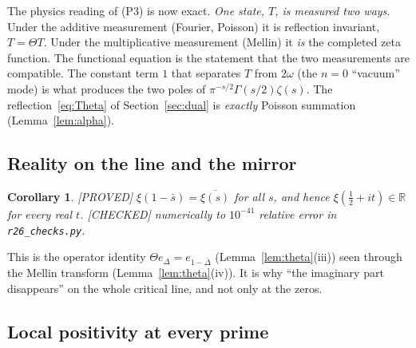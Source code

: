 \documentclass[11pt,a4paper]{article}
\theoremstyle{plain}
\newtheorem{corollary}[theorem]{Corollary}
\theoremstyle{definition}
\theoremstyle{remark}
\newcommand{\R}{\mathbb{R}}
\newcommand{\lab}[1]{\textsf{\small[#1]}}
\newcommand{\PROVED}{\lab{PROVED}}
\newcommand{\CHECKED}{\lab{CHECKED}}
\begin{document}
The physics reading of (P3) is now exact. \emph{One state, $T$, is
measured two ways.} Under the additive measurement (Fourier, Poisson) it is
reflection invariant, $T=\Theta T$. Under the multiplicative measurement
(Mellin) it \emph{is} the completed zeta function. The functional equation
is the statement that the two measurements are compatible. The constant
term $1$ that separates $T$ from $2\omega$ (the $n=0$ ``vacuum'' mode) is
what produces the two poles of $\pi^{-s/2}\Gamma(s/2)\zeta(s)$. The
reflection~\eqref{eq:Theta} of Section~\ref{sec:dual} is \emph{exactly}
Poisson summation (Lemma~\ref{lem:alpha}).

\subsection{Reality on the line and the mirror}

\begin{corollary}\label{cor:real}
\PROVED{} $\xi(1-\bar s)=\overline{\xi(s)}$ for all $s$, and hence
$\xi(\tfrac12+it)\in\R$ for every real $t$. \CHECKED{} numerically to
$10^{-41}$ relative error in \texttt{r26\_checks.py}.
\end{corollary}
\noindent
This is the operator identity $\Theta e_\Delta=e_{1-\bar\Delta}$
(Lemma~\ref{lem:theta}(iii)) seen through the Mellin transform
(Lemma~\ref{lem:theta}(iv)). It is why ``the imaginary part disappears''
on the whole critical line, and not only at the zeros.

\subsection{Local positivity at every prime}
\end{document}
